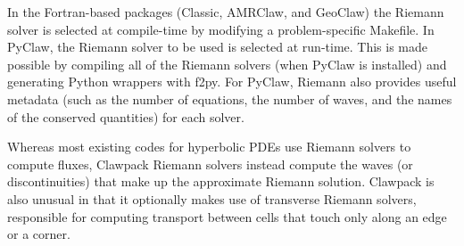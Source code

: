 In the Fortran-based packages (Classic, AMRClaw, and GeoClaw) the Riemann
solver is selected at compile-time by modifying a problem-specific Makefile.
In PyClaw, the Riemann solver to be used is selected at run-time.  This is
made possible by compiling all of the Riemann solvers (when PyClaw is installed)
and generating Python wrappers with f2py.  For PyClaw, Riemann also provides
useful metadata (such as the number of equations, the number of waves, and
the names of the conserved quantities) for each solver.

Whereas most existing codes for hyperbolic PDEs use Riemann solvers to
compute fluxes, Clawpack Riemann solvers instead compute the waves 
(or discontinuities) that make up the approximate Riemann solution.
Clawpack is also unusual in that it optionally makes use of transverse
Riemann solvers, responsible for computing transport between cells that
touch only along an edge or a corner.
